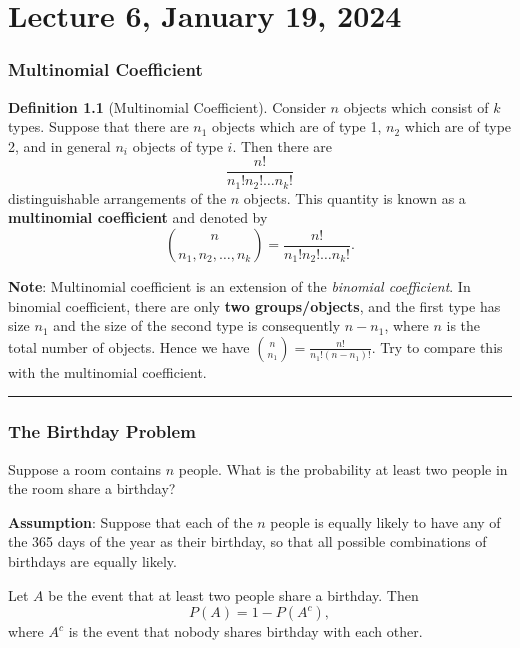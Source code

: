 \documentclass[
]{book}
\theoremstyle{definition}
\newtheorem{definition}{Definition}[chapter]
\theoremstyle{definition}
\theoremstyle{definition}
\theoremstyle{definition}
\theoremstyle{remark}
\begin{document}
\chapter{Lecture 6, January 19, 2024}\label{lecture-6-january-19-2024}

\subsection{Multinomial Coefficient}\label{multinomial-coefficient}

\begin{definition}[Multinomial Coefficient]
Consider \(n\) objects which consist of \(k\) types. Suppose that there are \(n_1\) objects which are of type 1, \(n_2\) which are of type 2, and in general \(n_i\) objects of type \(i\). Then there are
\[
\frac{n!}{n_1 ! n_2! \dots n_k !}
\]
distinguishable arrangements of the \(n\) objects. This quantity is known as a \textbf{multinomial coefficient} and denoted by
\[
\binom{n}{n_1,n_2,\dots,n_k}= \frac{n !}{n_1 ! n_2! \dots n_k !}.
\]
\end{definition}

\textbf{Note}: Multinomial coefficient is an extension of the \emph{binomial coefficient}. In binomial coefficient, there are only \textbf{two groups/objects}, and the first type has size \(n_1\) and the size of the second type is consequently \(n-n_1\), where \(n\) is the total number of objects. Hence we have \({n \choose n_1} = \frac{n!}{n_1! (n-n_1)!}\). Try to compare this with the multinomial coefficient.

\begin{center}\rule{0.5\linewidth}{0.5pt}\end{center}

\subsection{The Birthday Problem}\label{the-birthday-problem}

Suppose a room contains \(n\) people. What is the probability at least two people in the room share a birthday?

\textbf{Assumption}: Suppose that each of the \(n\) people is equally likely to have any of the 365 days of the year as their birthday, so that all possible combinations of birthdays are equally likely.

Let \(A\) be the event that at least two people share a birthday. Then
\[ P(A) = 1 - P(A^c),\]
where \(A^c\) is the event that nobody shares birthday with each other.
\end{document}

